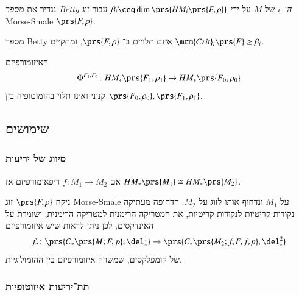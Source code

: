 \documentclass[a4paper,10pt,twoside,openany]{book}
\begin{document}
\begin{definition}
נגדיר את
\emph{מספר
\textenglish{Betty}
ה־%
$i$}
של
$M$
על ידי
$\beta_i \ceq \dim\prs{HM_i\prs{F,\rho}}$
עבור זוג
\textenglish{Morse-Smale}
$\prs{F,\rho}$.
\end{definition}

\begin{corollary}
מספר
\textenglish{Betty}
אינם תלויים ב־%
$\prs{F, \rho}$,
ומתקיים
$\mrm{Crit}_i\prs{F} \geq \beta_i$.
\end{corollary}

\begin{exercise}
האיזומורפיזם
\[\Phi^{F_1, F_0} \colon HM_*\prs{F_1, \rho_1} \to HM_*\prs{F_0, \rho_0}\]
קנוני ואינו תלוי בהומוטופיה בין
$\prs{F_0, \rho_0}, \prs{F_1, \rho_1}$.
\end{exercise}


\subsection{שימושים}

\subsubsection{סיווג של יריעות}

\begin{exercise}
אם
$f \colon M_1 \to M_2$
דיפאומורפיזם אז
$HM_*\prs{M_1} \cong HM_*\prs{M_2}$.
\end{exercise}

\begin{solution}
ניקח
$\prs{F,\rho}$
זוג
\textenglish{Morse-Smale}
על
$M_1$
ונדחוף אותו לזוג על
$M_2$.
הדחיפה מעתיקה נקודות קריטיות לנקודות קריטיות, את המטריקה הרימנית למטריקה הרימנית, ושומרת על האינדקסים, לכן ניתן לראות שיש איזומורפיזם
\[f_* \colon \prs{C_*\prs{M; F,p}, \del_*^1} \to \prs{C_*\prs{M_2; f_*F, f_*p}, \del_*^2}\]
של קומפלקסים, שמשרה איזומורפיזם בין ההומולוגיות.
\end{solution}

\subsubsection{תת־יריעות איזוטופיות}
\end{document}
